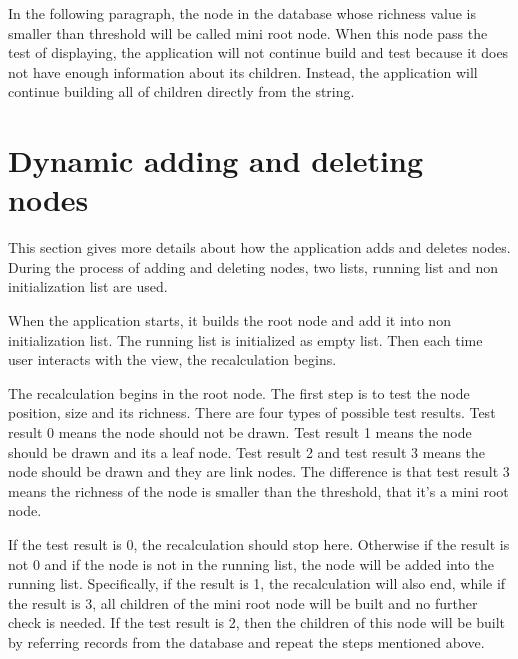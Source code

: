 \documentclass[MSc]{icldt}
\begin{document}
In the following paragraph, the node in the database whose richness value is smaller than threshold will be called mini root node. When this node pass the test of displaying, the application will not continue build and test because it does not have enough information about its children. Instead, the application will continue building all of children directly from the string. 

\section{Dynamic adding and deleting nodes}

This section gives more details about how the application adds and deletes nodes. During the process of adding and deleting nodes, two lists, running list and non initialization list are used. 

When the application starts, it builds the root node and add it into non initialization list. The running list is initialized as empty list. Then each time user interacts with the view, the recalculation begins.

The recalculation begins in the root node. The first step is to test the node position, size and its richness. There are four types of possible test results. Test result 0 means the node should not be drawn. Test result 1 means the node should be drawn and its a leaf node. Test result 2 and test result 3 means the node should be drawn and they are link nodes. The difference is that test result 3 means the richness of the node is smaller than the threshold, that it's a mini root node. 

If the test result is 0, the recalculation should stop here. Otherwise if the result is not 0 and if the node is not in the running list, the node will be added into the running list. Specifically, if the result is 1, the recalculation will also end, while if the result is 3, all children of the mini root node will be built and no further check is needed. If the test result is 2, then the children of this node will be built by referring records from the database and repeat the steps mentioned above.
\end{document}
